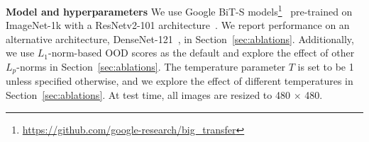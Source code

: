\documentclass{article}
\begin{document}

\textbf{Model and hyperparameters} 
We use Google BiT-S models\footnote{\url{https://github.com/google-research/big_transfer}}~\cite{kolesnikov2020big} pre-trained on ImageNet-1k with a ResNetv2-101 architecture~\cite{he2016identity}. We report performance on an alternative architecture, DenseNet-121~\cite{huang2017densely}, in Section~\ref{sec:ablations}. %
Additionally, we use $L_1$-norm-based OOD scores as the default and explore the effect of other $L_p$-norms in Section~\ref{sec:ablations}. The temperature parameter $T$ is set to be 1 unless specified otherwise, and we explore the effect of different temperatures in Section~\ref{sec:ablations}. At test time, all images are resized to 480 $\times$ 480.
\end{document}
